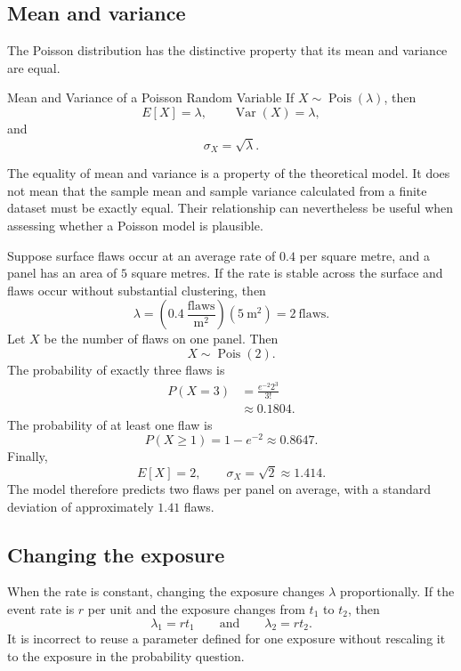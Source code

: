 \subsection{Mean and variance}

The Poisson distribution has the distinctive property that its mean and variance are equal.

\begin{theorem}{Mean and Variance of a Poisson Random Variable}
    If $X\sim\operatorname{Pois}(\lambda)$, then
    \[
    E[X]=\lambda,
    \qquad
    \operatorname{Var}(X)=\lambda,
    \]
    and
    \[
    \sigma_X=\sqrt{\lambda}.
    \]
\end{theorem}

The equality of mean and variance is a property of the theoretical model. It does not mean that the sample mean and sample variance calculated from a finite dataset must be exactly equal. Their relationship can nevertheless be useful when assessing whether a Poisson model is plausible.

\begin{example}\par
Suppose surface flaws occur at an average rate of $0.4$ per square metre, and a panel has an area of $5$ square metres. If the rate is stable across the surface and flaws occur without substantial clustering, then
\[
\lambda
=\left(0.4\ \frac{\text{flaws}}{\text{m}^2}\right)
(5\ \text{m}^2)
=2\ \text{flaws}.
\]
Let $X$ be the number of flaws on one panel. Then
\[
X\sim\operatorname{Pois}(2).
\]
The probability of exactly three flaws is
\[
\begin{aligned}
P(X=3)
&=\frac{e^{-2}2^3}{3!}\\
&\approx0.1804.
\end{aligned}
\]
The probability of at least one flaw is
\[
P(X\geq1)=1-e^{-2}\approx0.8647.
\]
Finally,
\[
E[X]=2,
\qquad
\sigma_X=\sqrt{2}\approx1.414.
\]
The model therefore predicts two flaws per panel on average, with a standard deviation of approximately $1.41$ flaws.
\end{example}

\subsection{Changing the exposure}

When the rate is constant, changing the exposure changes $\lambda$ proportionally. If the event rate is $r$ per unit and the exposure changes from $t_1$ to $t_2$, then
\[
\lambda_1=rt_1
\qquad\text{and}\qquad
\lambda_2=rt_2.
\]
It is incorrect to reuse a parameter defined for one exposure without rescaling it to the exposure in the probability question.

